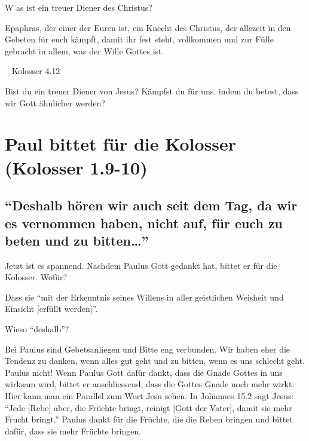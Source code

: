 \documentclass[
  12pt,
]{krantz}
\makeatletter
\newenvironment{kframe}{%
\medskip{}
\setlength{\fboxsep}{.8em}
 \def\at@end@of@kframe{}%
 \ifinner\ifhmode%
  \def\at@end@of@kframe{\end{minipage}}%
  \begin{minipage}{\columnwidth}%
 \fi\fi%
 \def\FrameCommand##1{\hskip\@totalleftmargin \hskip-\fboxsep
 \colorbox{shadecolor}{##1}\hskip-\fboxsep
     \hskip-\linewidth \hskip-\@totalleftmargin \hskip\columnwidth}%
 \MakeFramed {\advance\hsize-\width
   \@totalleftmargin\z@ \linewidth\hsize
   \@setminipage}}%
 {\par\unskip\endMakeFramed%
 \at@end@of@kframe}
\newenvironment{rmdblock}[1]
  {
  \begin{itemize}
  \renewcommand{\labelitemi}{
    \raisebox{-.7\height}[0pt][0pt]{
      {\setkeys{Gin}{width=3em,keepaspectratio}\texttt{[image: img/\#1]}}
    }
  }
  \setlength{\fboxsep}{1em}
  \begin{kframe}
  \item
  }
  {
  \end{kframe}
  \end{itemize}
  }
\newenvironment{rmdquestion}
  {\begin{rmdblock}{question}}
  {\end{rmdblock}}
\newenvironment{rmdquote}
  {\begin{rmdblock}{quote}}
  {\end{rmdblock}}
\makeatother
\begin{document}
W as ist ein treuer Diener des Christus?

\begin{rmdquote}
Epaphras, der einer der Euren ist, ein Knecht des Christus, der allezeit
in den Gebeten für euch kämpft, damit ihr fest steht, vollkommen und zur
Fülle gebracht in allem, was der Wille Gottes ist.

-- Kolosser 4.12
\end{rmdquote}

\begin{rmdquestion}
Bist du ein treuer Diener von Jesus? Kämpfst du für uns, indem du
betest, dass wir Gott ähnlicher werden?
\end{rmdquestion}

\hypertarget{paul-bittet-fuxfcr-die-kolosser-kolosser-1.9-10}{%
\section{Paul bittet für die Kolosser (Kolosser 1.9-10)}\label{paul-bittet-fuxfcr-die-kolosser-kolosser-1.9-10}}

\hypertarget{deshalb-huxf6ren-wir-auch-seit-dem-tag-da-wir-es-vernommen-haben-nicht-auf-fuxfcr-euch-zu-beten-und-zu-bitten}{%
\subsection{\texorpdfstring{``Deshalb hören wir auch seit dem Tag, da wir es vernommen haben, nicht auf, für euch zu beten und zu bitten\ldots{}''}{``Deshalb hören wir auch seit dem Tag, da wir es vernommen haben, nicht auf, für euch zu beten und zu bitten\ldots''}}\label{deshalb-huxf6ren-wir-auch-seit-dem-tag-da-wir-es-vernommen-haben-nicht-auf-fuxfcr-euch-zu-beten-und-zu-bitten}}

Jetzt ist es spannend. Nachdem Paulus Gott gedankt hat, bittet er für die Kolosser. Wofür?

Dass sie ``mit der Erkenntnis seines Willens in aller geistlichen Weisheit und Einsicht {[}erfüllt werden{]}''.

Wieso ``deshalb''?

Bei Paulus sind Gebetsanliegen und Bitte eng verbunden. Wir haben eher die Tendenz zu danken, wenn alles gut geht und zu bitten, wenn es uns schlecht geht. Paulus nicht! Wenn Paulus Gott dafür dankt, dass die Gnade Gottes in uns wirksam wird, bittet er anschliessend, dass die Gottes Gnade noch mehr wirkt. Hier kann man ein Parallel zum Wort Jesu sehen. In Johannes 15.2 sagt Jesus: ``Jede {[}Rebe{]} aber, die Früchte bringt, reinigt {[}Gott der Vater{]}, damit sie mehr Frucht bringt.''
Paulus dankt für die Früchte, die die Reben bringen und bittet dafür, dass sie mehr Früchte bringen.
\end{document}
